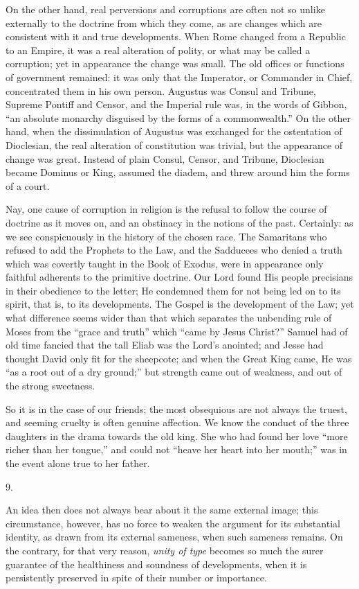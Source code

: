On the other hand, real perversions and corruptions
are often not so unlike externally to the doctrine from
which they come, as are changes which are consistent with
it and true developments. When Rome changed from a
Republic to an Empire, it was a real alteration of
polity, or what may be called a corruption; yet in
appearance the change was small. The old offices or
functions of government remained: it was only that the
Imperator, or Commander in Chief, concentrated them in
his own person. Augustus was Consul and Tribune, Supreme
Pontiff and Censor, and the Imperial rule was, in the
words of Gibbon, ``an absolute monarchy disguised by
the forms of a commonwealth.'' On the other hand,
when the dissimulation of Augustus was exchanged for the
ostentation of Dioclesian, the real alteration of
constitution was trivial, but the appearance of change
was great. Instead of plain Consul, Censor, and Tribune,
Dioclesian became Dominus or King, assumed the diadem,
and threw around him the forms of a court.

Nay, one cause of corruption in religion is the
refusal to follow the course of doctrine as it moves on,
and an obstinacy in the notions of the past. Certainly:
as we see conspicuously in the history of the chosen
race. The Samaritans who refused to add the Prophets to
the Law, and the Sadducees who denied a truth which was
covertly taught in the Book of Exodus, were in appearance
only faithful adherents to the primitive doctrine. Our
Lord found His people precisians in their obedience to
the letter; He condemned them for not being led on to its
spirit, that is, to its developments. The Gospel is the
development of the Law; yet what difference seems wider
than that which separates the unbending rule of Moses
from the ``grace and truth'' which ``came by
Jesus Christ?'' Samuel had of old time fancied that
the tall Eliab was the Lord's anointed; and Jesse had
thought David only fit for the sheepcote; and when the
Great King came, He was ``as a root out of a dry
ground;'' but strength came out of weakness, and out
of the strong sweetness.

So it is in the case of our friends; the most
obsequious are not always the truest, and seeming cruelty
is often genuine affection. We know the conduct of the
three daughters in the drama towards the old king. She
who had found her love ``more richer than her
tongue,'' and could not ``heave her heart into
her mouth;'' was in the event alone true to her
father.

9.

An idea then does not always bear about it the same
external image; this circumstance, however, has no force
to weaken the argument for its substantial identity, as
drawn from its external sameness, when such sameness
remains. On the contrary, for that very reason, \emph{unity
of type} becomes so much the surer guarantee of the
healthiness and soundness of developments, when it is
persistently preserved in spite of their number or
importance.

